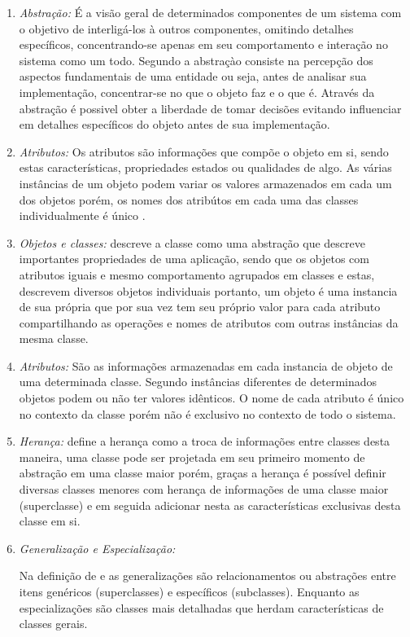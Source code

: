 \begin{enumerate}
\item \textit{Abstração:} É a visão geral de determinados componentes de um sistema com o objetivo de interligá-los à outros componentes, omitindo detalhes específicos, concentrando-se apenas em seu comportamento e interação no sistema como um todo. Segundo \cite{rumbaugh1991object} a abstraçào consiste na percepção dos aspectos fundamentais de uma entidade ou seja, antes de analisar sua implementação, concentrar-se no que o objeto faz e o que é. Através da abstração é possivel obter a liberdade de tomar decisões evitando influenciar em detalhes específicos do objeto antes de sua implementação.

\item \textit{Atributos:} 
Os atributos são informações que compõe o objeto em si, sendo estas características, propriedades estados ou qualidades de algo. As várias instâncias de um objeto podem variar os valores armazenados em cada um dos objetos porém, os nomes dos atribútos em cada uma das classes individualmente é único \cite{rumbaugh1991object}.

\item \textit{Objetos e classes:}  
\cite{rumbaugh1991object} descreve a classe como uma abstração que descreve importantes propriedades de uma aplicação, sendo que os objetos com atributos iguais e mesmo comportamento agrupados em classes e estas, descrevem diversos objetos individuais portanto, um objeto é uma instancia de sua própria que por sua vez tem seu próprio valor para cada atributo compartilhando as operações e nomes de atributos com outras instâncias da mesma classe.

\item \textit{Atributos:} São as informações armazenadas em cada instancia de objeto de uma determinada classe. Segundo \cite{rumbaugh1991object} instâncias diferentes de determinados objetos podem ou não ter valores idênticos. O nome de cada atributo é único no contexto da classe porém não é exclusivo no contexto de todo o sistema.

\item \textit{Herança:} \cite{rumbaugh1991object} define a herança como a troca de informações entre classes desta maneira, uma classe pode ser projetada em seu primeiro momento de abstração em uma classe maior porém, graças a herança é possível definir diversas classes menores com herança de informações de uma classe maior (superclasse) e em seguida adicionar nesta as características exclusivas desta classe em si. 

\item \textit{Generalização e Especialização:} 

Na definição de \cite{rumbaugh1991object} e \cite{booch2005unified} as generalizações são relacionamentos ou abstrações entre itens genéricos (superclasses) e específicos (subclasses). Enquanto as especializações são classes mais detalhadas que herdam características de classes gerais.





\end{enumerate}

